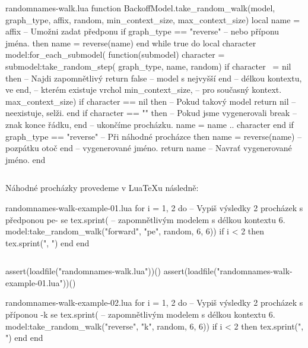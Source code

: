 \documentclass{csbulletin}
\newcommand\myinputminted[3][]{%
  \inputminted[#1]{#2}{#3}%
}
\newcommand\myinputminted[3][]{%
  \inputminted[#1]{#2}{code-placeholder.#2}%
}
\begin{document}
\begin{filecontents}{randomnames-walk.lua}
function BackoffModel.take_random_walk(model, graph_type,
                                       affix, random,
                                       min_context_size,
                                       max_context_size)
  local name = affix              -- Umožni zadat předponu
  if graph_type == "reverse"      -- nebo příponu jména.
    then name = reverse(name)
  end
  while true do
    local character
    model:for_each_submodel(
      function(submodel)
        character = submodel:take_random_step(
          graph_type, name, random)
        if character ~= nil then  -- Najdi zapomnětlivý
          return false            -- model s nejvyšší
        end                       -- délkou kontextu, ve
      end,                        -- kterém existuje vrchol
      min_context_size,           -- pro současný kontext.
      max_context_size)
    if character == nil then      -- Pokud takový model
      return nil                  -- neexistuje, selži.
    end
    if character == "\n" then     -- Pokud jsme vygenerovali
      break                       -- znak konce řádku,
    end                           -- ukončíme procházku.
    name = name .. character
  end
  if graph_type == "reverse"      -- Při náhodné procházce
    then name = reverse(name)     -- pozpátku otoč
  end                             -- vygenerované jméno.
  return name                     -- Navrať vygenerované jméno.
end
\end{filecontents}
\myinputminted{lua}{randomnames-walk.lua}

Náhodné procházky provedeme v Lua\TeX u následně:

\begin{filecontents}{randomnames-walk-example-01.lua}
for i = 1, 2 do -- Vypiš výsledky 2 procházek s předponou pe- se
  tex.sprint(   -- zapomnětlivým modelem s délkou kontextu 6.
    model:take_random_walk("forward", "pe", random, 6, 6))
  if i < 2 then tex.sprint(", ") end
end
\end{filecontents}
\myinputminted[linenos=false]{lua}{randomnames-walk-example-01.lua}

\noindent
\begin{luacode*}
assert(loadfile("randomnames-walk.lua"))()
assert(loadfile("randomnames-walk-example-01.lua"))()
\end{luacode*}

\begin{filecontents}{randomnames-walk-example-02.lua}
for i = 1, 2 do -- Vypiš výsledky 2 procházek s příponou -k se
  tex.sprint(   -- zapomnětlivým modelem s délkou kontextu 6.
    model:take_random_walk("reverse", "k", random, 6, 6))
  if i < 2 then tex.sprint(", ") end
end
\end{filecontents}
\myinputminted[linenos=false]{lua}{randomnames-walk-example-02.lua}
\end{document}
